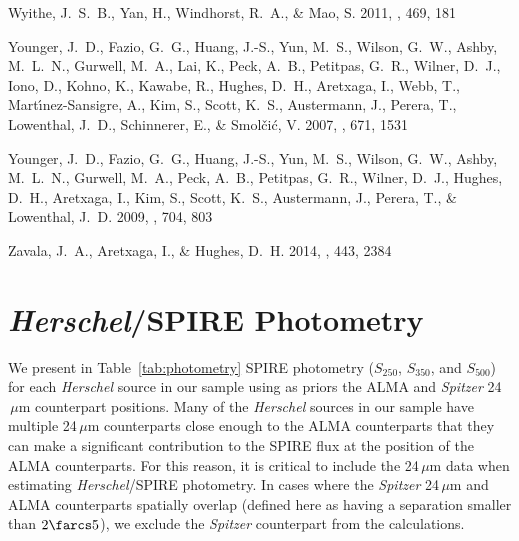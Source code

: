 \documentclass[iop]{emulateapj}
\begin{document}
\begin{thebibliography}{107}
{Wyithe}, J.~S.~B., {Yan}, H., {Windhorst}, R.~A., \& {Mao}, S. 2011, \nat,
  469, 181

{Younger}, J.~D., {Fazio}, G.~G., {Huang}, J.-S., {Yun}, M.~S., {Wilson},
  G.~W., {Ashby}, M.~L.~N., {Gurwell}, M.~A., {Lai}, K., {Peck}, A.~B.,
  {Petitpas}, G.~R., {Wilner}, D.~J., {Iono}, D., {Kohno}, K., {Kawabe}, R.,
  {Hughes}, D.~H., {Aretxaga}, I., {Webb}, T., {Mart{\'{\i}}nez-Sansigre}, A.,
  {Kim}, S., {Scott}, K.~S., {Austermann}, J., {Perera}, T., {Lowenthal},
  J.~D., {Schinnerer}, E., \& {Smol{\v c}i{\'c}}, V. 2007, \apj, 671, 1531

{Younger}, J.~D., {Fazio}, G.~G., {Huang}, J.-S., {Yun}, M.~S., {Wilson},
  G.~W., {Ashby}, M.~L.~N., {Gurwell}, M.~A., {Peck}, A.~B., {Petitpas}, G.~R.,
  {Wilner}, D.~J., {Hughes}, D.~H., {Aretxaga}, I., {Kim}, S., {Scott}, K.~S.,
  {Austermann}, J., {Perera}, T., \& {Lowenthal}, J.~D. 2009, \apj, 704, 803

{Zavala}, J.~A., {Aretxaga}, I., \& {Hughes}, D.~H. 2014, \mnras, 443, 2384

\end{thebibliography}

\appendix

\section{{\it Herschel}/SPIRE Photometry}\label{sec:photometry}

We present in Table~\ref{tab:photometry} SPIRE photometry ($S_{250}$,
$S_{350}$, and $S_{500}$) for each {\it Herschel} source in our sample using as
priors the ALMA and {\it Spitzer} 24$\,\mu$m counterpart positions.  Many of
the {\it Herschel} sources in our sample have multiple 24$\,\mu$m counterparts
close enough to the ALMA counterparts that they can make a significant
contribution to the SPIRE flux at the position of the ALMA counterparts.  For
this reason, it is critical to include the 24$\,\mu$m data when estimating {\it
Herschel}/SPIRE photometry.  In cases where the {\it Spitzer} 24$\,\mu$m and
ALMA counterparts spatially overlap (defined here as having a separation
smaller than $2\farcs5$), we exclude the {\it Spitzer} counterpart from the
calculations.  
\end{document}
